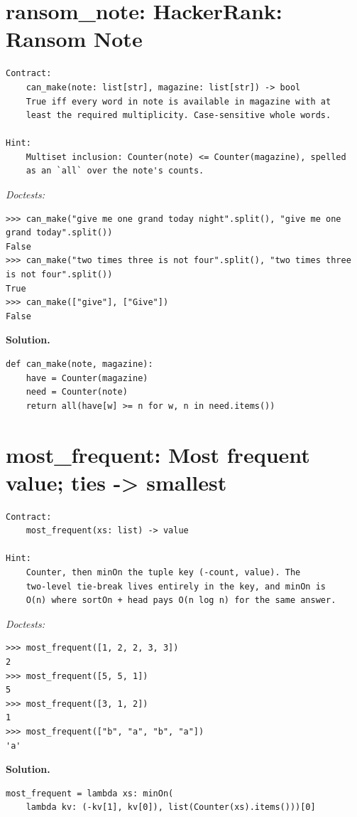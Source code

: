 \documentclass[11pt,letterpaper]{book}
\begin{document}
\section{ransom\_note: HackerRank: Ransom Note}
\begin{lstlisting}[style=spec]
Contract:
    can_make(note: list[str], magazine: list[str]) -> bool
    True iff every word in note is available in magazine with at
    least the required multiplicity. Case-sensitive whole words.

Hint:
    Multiset inclusion: Counter(note) <= Counter(magazine), spelled
    as an `all` over the note's counts.
\end{lstlisting}
\noindent\textit{Doctests:}
\begin{lstlisting}[style=spec]
>>> can_make("give me one grand today night".split(), "give me one grand today".split())
False
>>> can_make("two times three is not four".split(), "two times three is not four".split())
True
>>> can_make(["give"], ["Give"])
False
\end{lstlisting}
\noindent\textbf{Solution.}
\begin{lstlisting}[style=code]
def can_make(note, magazine):
    have = Counter(magazine)
    need = Counter(note)
    return all(have[w] >= n for w, n in need.items())
\end{lstlisting}

\section{most\_frequent: Most frequent value; ties -> smallest}
\begin{lstlisting}[style=spec]
Contract:
    most_frequent(xs: list) -> value

Hint:
    Counter, then minOn the tuple key (-count, value). The
    two-level tie-break lives entirely in the key, and minOn is
    O(n) where sortOn + head pays O(n log n) for the same answer.
\end{lstlisting}
\noindent\textit{Doctests:}
\begin{lstlisting}[style=spec]
>>> most_frequent([1, 2, 2, 3, 3])
2
>>> most_frequent([5, 5, 1])
5
>>> most_frequent([3, 1, 2])
1
>>> most_frequent(["b", "a", "b", "a"])
'a'
\end{lstlisting}
\noindent\textbf{Solution.}
\begin{lstlisting}[style=code]
most_frequent = lambda xs: minOn(
    lambda kv: (-kv[1], kv[0]), list(Counter(xs).items()))[0]
\end{lstlisting}
\end{document}
